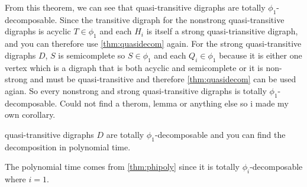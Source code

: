 From this theorem, we can see that quasi-transitive digraphs are totally $\phi_1$-decomposable. 
Since the transitive digraph for the nonstrong quasi-transitive digraphs is acyclic $T\in \phi_1$ and each $H_i$ is itself a strong quasi-triansitive digraph, and you can therefore use \autoref{thm:quasidecom} again.  
For the strong quasi-transitive digraphs $D$, $S$ is semicomplete so $S\in \phi_1$ and each $Q_i \in \phi_1$ because it is either one vertex which is a digraph that is both acyclic and semicomplete or it is non-strong and must be quasi-transitive and therefore \autoref{thm:quasidecom} can be used agian. So every nonstrong and strong quasi-transitive digraphs is totally $\phi_1$-decomposable.
Could not find a therom, lemma or anything else so i made my own corollary.
\begin{cor}
    quasi-transitive digraphs $D$ are totally $\phi_1$-decomposable and you can find the decomposition in polynomial time.
\end{cor}
The polynomial time comes from \autoref{thm:phipoly} since it is totally $\phi_i$-decomposable where $i=1$.
